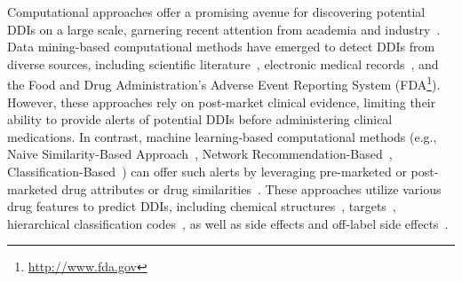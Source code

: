 \documentclass[unnumsec,webpdf,contemporary,large]{oup-authoring-template}%
\theoremstyle{thmstyleone}%
\theoremstyle{thmstyletwo}%
\theoremstyle{thmstylethree}%
\begin{document}
Computational approaches offer a promising avenue for discovering potential DDIs on a large scale, garnering recent attention from academia and industry~\cite{Barbara2016, Zhou2016}. Data mining-based computational methods have emerged to detect DDIs from diverse sources, including scientific literature~\cite{Bui2014, Zhang2016le}, electronic medical records~\cite{Yamanishi2008}, and the Food and Drug Administration’s Adverse Event Reporting System (FDA\footnote{\url{http://www.fda.gov}}). However, these approaches rely on post-market clinical evidence, limiting their ability to provide alerts of potential DDIs before administering clinical medications. In contrast, machine learning-based computational methods (e.g., Naive Similarity-Based Approach~\cite{Vilar2014}, Network Recommendation-Based~\cite{Zhang2015}, Classification-Based~\cite{Cheng2014}) can offer such alerts by leveraging pre-marketed or post-marketed drug attributes or drug similarities~\cite{Pahikkala2015}. These approaches utilize various drug features to predict DDIs, including chemical structures~\cite{Vilar2014}, targets~\cite{Luo2014}, hierarchical classification codes~\cite{Cheng2014}, as well as side effects and off-label side effects~\cite{Zhang2015, ShiHLLZY17}.
\end{document}
